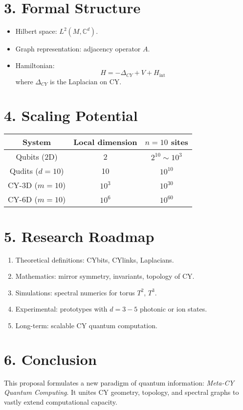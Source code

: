 \documentclass[12pt,a4paper]{article}
\begin{document}
\section*{3. Formal Structure}
\begin{itemize}
  \item Hilbert space: $L^2(M, \mathbb{C}^d)$.
  \item Graph representation: adjacency operator $A$.
  \item Hamiltonian:
  \[
  H = -\Delta_{CY} + V + H_{\text{int}}
  \]
  where $\Delta_{CY}$ is the Laplacian on CY.
\end{itemize}

\section*{4. Scaling Potential}
\begin{center}
\begin{tabular}{|c|c|c|}
\hline
System & Local dimension & $n=10$ sites \\
\hline
Qubits (2D) & 2 & $2^{10} \sim 10^3$ \\
Qudits ($d=10$) & 10 & $10^{10}$ \\
CY-3D ($m=10$) & $10^3$ & $10^{30}$ \\
CY-6D ($m=10$) & $10^6$ & $10^{60}$ \\
\hline
\end{tabular}
\end{center}

\section*{5. Research Roadmap}
\begin{enumerate}
  \item Theoretical definitions: CYbits, CYlinks, Laplacians.
  \item Mathematics: mirror symmetry, invariants, topology of CY.
  \item Simulations: spectral numerics for torus $T^2$, $T^3$.
  \item Experimental: prototypes with $d=3-5$ photonic or ion states.
  \item Long-term: scalable CY quantum computation.
\end{enumerate}

\section*{6. Conclusion}
This proposal formulates a new paradigm of quantum information: 
\emph{Meta-CY Quantum Computing}. 
It unites CY geometry, topology, and spectral graphs 
to vastly extend computational capacity.
\end{document}
